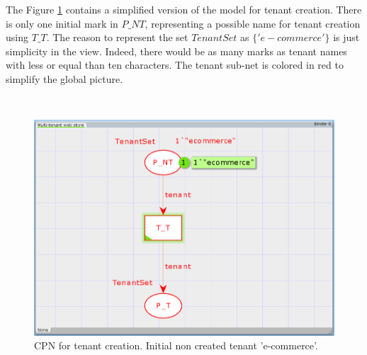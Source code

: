 \documentclass[12pt,english]{article} %
\begin{document}
The Figure \ref{fig:mws-cpn-tenant-creation-init} contains a simplified version of the model for tenant creation.
There is only one initial mark in $P\_NT$, representing a possible name for tenant creation using $T\_T$.
The reason to represent the set $TenantSet$ as $\{'e-commerce'\}$ is just simplicity in the view.
Indeed, there would be as many marks as tenant names with less or equal than ten characters.
The tenant sub-net is colored in red to simplify the global picture.

\

\begin{figure}[H]
    \centering
    \includegraphics[scale=0.45]{img/mws/cpn/mws_cpn_tenant_init.png}
    \caption{CPN for tenant creation. Initial non created tenant 'e-commerce'.}
    \label{fig:mws-cpn-tenant-creation-init}
\end{figure}                                                                           
                                                                
\
                 
\end{document}
